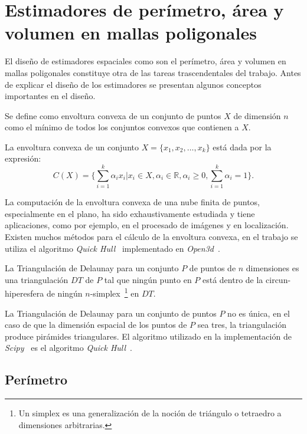 \section{Estimadores de perímetro, área y volumen en mallas poligonales}\label{section:measure}

El diseño de estimadores espaciales como son el perímetro, área y volumen en mallas poligonales constituye otra de las tareas trascendentales del trabajo. Antes de explicar el diseño de los estimadores se presentan algunos conceptos importantes en el diseño.

\begin{definition}
	Se define como envoltura convexa de un conjunto de puntos $X$ de dimensión $n$ como el mínimo de todos los conjuntos convexos que contienen a $X$. 
\end{definition}

La envoltura convexa de un conjunto $X = \{x_1, x_2, \ldots, x_k\}$ está dada por la expresión:
$$ C(X) = \bigg\{\sum_{i = 1}^{k} \alpha_i x_i | x_i \in X, \alpha_i \in \mathbb{R}, \alpha_i \geq 0, \sum_{i = 1}^{k} \alpha_i = 1\bigg\}.$$

La computación de la envoltura convexa de una nube finita de puntos, especialmente en el plano, ha sido exhaustivamente estudiada y tiene aplicaciones, como por ejemplo, en el procesado de imágenes y en localización. Existen muchos métodos para el cálculo de la envoltura convexa, en el trabajo se utiliza el algoritmo \textit{Quick Hull}~\cite{barber1996quickhull} implementado en \textit{Open3d}~\cite{zhou2018open3d}.

\begin{definition}
	La Triangulación de Delaunay para un conjunto $P$ de puntos de $n$ dimensiones es una triangulación $DT$ de $P$ tal que ningún punto en $P$ está dentro de la circun-hiperesfera de ningún $n$-simplex~\footnote{Un simplex es una generalización de la noción de triángulo o tetraedro a dimensiones arbitrarias.} en $DT$.
\end{definition}

La Triangulación de Delaunay para un conjunto de puntos $P$ no es única, en el caso de que la dimensión espacial de los puntos de $P$ sea tres, la triangulación produce pirámides triangulares. El algoritmo utilizado en la implementación de \textit{Scipy}~\cite{virtanen2020scipy} es el algoritmo \textit{Quick Hull}~\cite{barber1996quickhull}.

\subsection{Perímetro}

